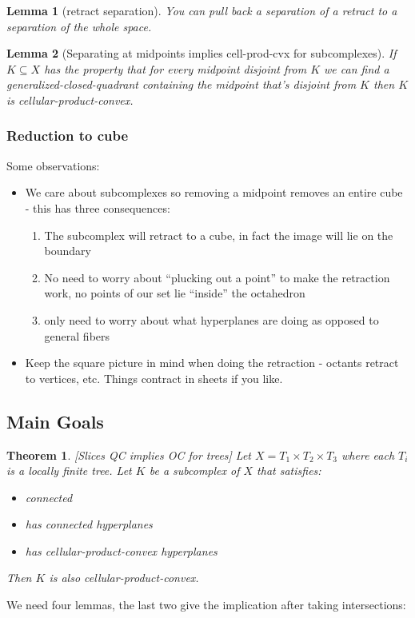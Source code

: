 \documentclass{article}
\theoremstyle{mystyle}
\newtheorem{thm}{Theorem}[section]
\newtheorem{lem}{Lemma}[section]
\theoremstyle{remark}
\begin{document}
\begin{lem}
    [retract separation]
    You can pull back a separation of a retract to a separation of the whole space.
\end{lem}
\begin{lem}
	[\label{lem:midpointsep}Separating at midpoints implies cell-prod-cvx for subcomplexes]
	If \(K \subseteq X \) has the property that for every midpoint disjoint from \(K\) we can find a generalized-closed-quadrant containing the midpoint that's disjoint from \(K\) then \(K\) is cellular-product-convex.
\end{lem}

\subsubsection{Reduction to cube}

Some observations:
\begin{itemize}
	\item We care about subcomplexes so removing a midpoint removes an entire cube - this has three consequences:
		\begin{enumerate}
			\item The subcomplex will retract to a cube, in fact the image will lie on the boundary
			\item No need to worry about ``plucking out a point'' to make the retraction work, no points of our set lie ``inside'' the octahedron
			\item only need to worry about what hyperplanes are doing as opposed to general fibers
		\end{enumerate}
	\item Keep the square picture in mind when doing the retraction - octants retract to vertices, etc. Things contract in sheets if you like.
\end{itemize}

\subsection{Main Goals}
\begin{thm}
	\label{thm:QCOC}
    [Slices QC implies OC for trees]
	Let \(X=T_{1} \times T_{2} \times T_{3}\) where each \(T_{i}\) is a locally finite tree. Let \(K\) be a subcomplex of \(X\) that satisfies: 
	\begin{itemize}
		\item connected
		\item has connected hyperplanes
		\item has cellular-product-convex hyperplanes 
	\end{itemize}
Then \(K\) is also cellular-product-convex.
\end{thm}
We need four lemmas, the last two give the implication after taking intersections:
\end{document}
